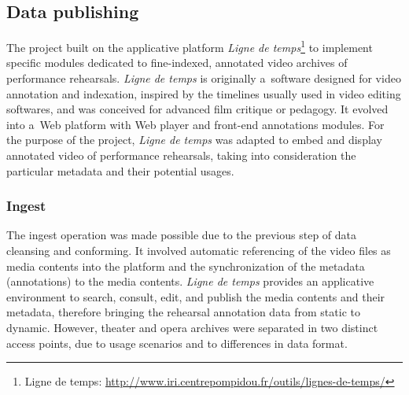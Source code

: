 \documentclass[conference]{IEEEtran}
\newcommand{\todo}[1]{\noindent\textcolor{red}{{\bf \{ToDo} #1{\bf \}}}}
\begin{document}
 



\subsection{Data publishing}
The project built on the applicative platform \emph{Ligne de temps}\footnote{Ligne de temps: \url{http://www.iri.centrepompidou.fr/outils/lignes-de-temps/}} to implement specific modules dedicated to fine-indexed, annotated video archives of performance rehearsals. \emph{Ligne de temps} is originally a~software designed for video annotation and indexation, inspired by the timelines usually used in video editing softwares, and was conceived for advanced film critique or pedagogy. It evolved into a~Web platform with Web player and front-end annotations modules. For the purpose of the project, \emph{Ligne de temps} was adapted to embed and display annotated video of performance rehearsals, taking into consideration the particular metadata and their potential usages.

\subsubsection{Ingest}
The ingest operation was made possible due to the previous step of data cleansing and conforming. It involved automatic referencing of the video files as media contents into the platform and the synchronization of the metadata (annotations) to the media contents. \emph{Ligne de temps} provides an applicative environment to search, consult, edit, and publish the media contents and their metadata, therefore bringing the rehearsal annotation data from static to dynamic. However, theater and opera archives were separated in two distinct access points, due to usage scenarios and to differences in data format.

\end{document}
